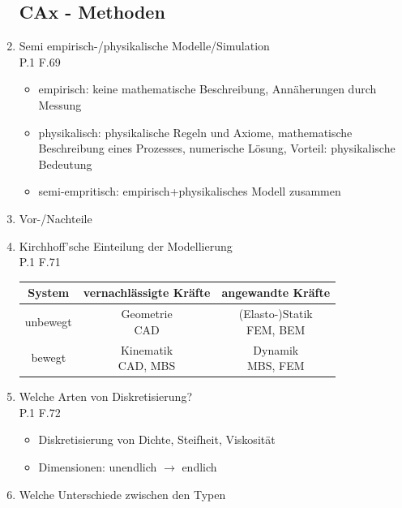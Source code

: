 \documentclass[10pt,a4paper,fleqn]{article}
\begin{document}
\begin{enumerate}
\subsection{CAx - Methoden}
	\item Semi empirisch-/physikalische Modelle/Simulation\\
		P.1 F.69
		\begin{itemize}
			\item empirisch: keine mathematische Beschreibung, Annäherungen durch Messung
			\item physikalisch: physikalische Regeln und Axiome, mathematische Beschreibung eines Prozesses, numerische Lösung, Vorteil: physikalische Bedeutung
			\item semi-empritisch: empirisch+physikalisches Modell zusammen
		\end{itemize}
	\item Vor-/Nachteile
	\item Kirchhoff'sche Einteilung der Modellierung\\
		P.1 F.71
		\begin{center}
			\begin{tabular}{|c|c|c|}
			\hline 
			System & vernachlässigte Kräfte & angewandte Kräfte \\ 
			\hline 
			unbewegt & \pbox{20cm}{Geometrie\\ CAD} & \pbox{20cm}{(Elasto-)Statik \\ FEM, BEM} \\ 
			\hline
			bewegt & \pbox{20cm}{Kinematik \\ CAD, MBS} & \pbox{20cm}{Dynamik \\  MBS, FEM} \\ 
			\hline 
			\end{tabular} 
		\end{center}
	\item Welche Arten von Diskretisierung?\\
		P.1 F.72
			\begin{itemize}
				\item Diskretisierung von Dichte, Steifheit, Viskosität
				\item Dimensionen: unendlich $\rightarrow$ endlich
			\end{itemize}
	\item Welche Unterschiede zwischen den Typen
	

\end{enumerate}
\end{document}
